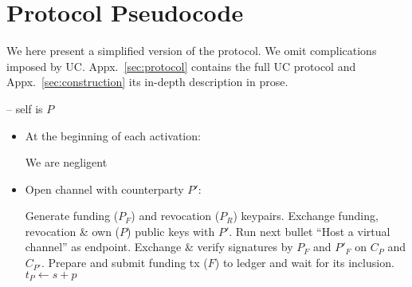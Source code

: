 \section{Protocol Pseudocode}
\label{sec:pseudocode}

We here present a simplified version of the \pchan protocol. We omit
complications imposed by UC. Appx.~\ref{sec:protocol} contains
the full UC protocol and Appx.~\ref{sec:construction} its in-depth
description in prose.
\ \\

\begin{center}
  \begin{processbox}{\pchan -- self is $P$}
    \begin{itemize}
      \item At the beginning of each activation:
      \begin{algorithmic}[0]
          \State We are negligent 
        \EndIf
      \end{algorithmic}

      \item Open channel with counterparty $P'$: 
      \begin{algorithmic}[0]
        \State Generate funding ($P_F$) and revocation ($P_R$) keypairs.
        \State Exchange funding, revocation \& own ($P$) public keys with $P'$.
          \State Run next bullet ``Host a virtual channel'' as endpoint.
        \EndIf
        \State Exchange \& verify signatures by $P_F$ and $P'_F$ on
        $C_P$ and $C_{P'}$.
          \State Prepare and submit funding tx ($F$) to ledger and wait for
          its inclusion. 
          \State $t_P \gets s + p$ 
          \State {}
        \EndIf
      \end{algorithmic}


\end{itemize}
\end{processbox}
\end{center}
